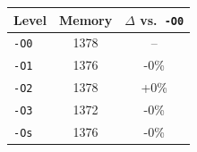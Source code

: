 \begin{tabular*}{\columnwidth}{@{\extracolsep\fill}lcc@{\extracolsep\fill}}
\toprule
\textbf{Level} & \textbf{Memory} & \textbf{$\Delta$ vs.\ \texttt{-O0}} \\
\midrule
\texttt{-O0} & 1378 & -- \\
\texttt{-O1} & 1376 & -0\% \\
\texttt{-O2} & 1378 & +0\% \\
\texttt{-O3} & 1372 & -0\% \\
\texttt{-Os} & 1376 & -0\% \\
\bottomrule
\end{tabular*}
